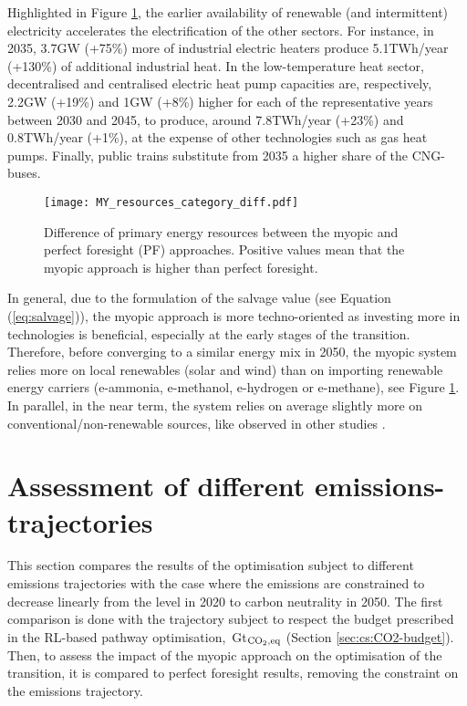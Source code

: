 Highlighted in Figure \ref{fig:my_pestd_res_cat_diff}, the earlier availability of renewable (and intermittent) electricity accelerates the electrification of the other sectors. For instance, in 2035, 3.7GW (+75\%) more of industrial electric heaters produce 5.1TWh/year (+130\%) of additional industrial heat. In the low-temperature heat sector, decentralised and centralised electric heat pump capacities are, respectively, 2.2GW (+19\%) and 1GW (+8\%) higher for each of the representative years between 2030 and 2045, to produce, around 7.8TWh/year (+23\%) and 0.8TWh/year (+1\%), at the expense of other technologies such as gas heat pumps. Finally, public trains substitute from 2035 a higher share of the CNG-buses.

 \begin{figure}[!htbp]
\centering
\texttt{[image: MY\_resources\_category\_diff.pdf]}
\caption{Difference of primary energy resources between the myopic and perfect foresight (PF) approaches. Positive values mean that the myopic approach is higher than perfect foresight.}
\label{fig:my_pestd_res_cat_diff}
\end{figure}

In general, due to the formulation of the salvage value (see Equation (\ref{eq:salvage})), the myopic approach is more techno-oriented as investing more in technologies is beneficial, especially at the early stages of the transition. Therefore, before converging to a similar energy mix in 2050, the myopic system relies more on local renewables (\eg solar and wind) than on importing renewable energy carriers (\eg e-ammonia, e-methanol, e-hydrogen or e-methane), see Figure \ref{fig:my_pestd_res_cat_diff}. In parallel, in the near term, the system relies on average slightly more on conventional/non-renewable sources, like observed in other studies \cite{keppo2010short,nyqvist2005limited,hedenus2006induced}.


\section{Assessment of different emissions-trajectories}
\label{app:CO2_trajectories}
This section compares the results of the optimisation subject to different emissions trajectories with the case where the emissions are constrained to decrease linearly from the level in 2020 to carbon neutrality in 2050. The first comparison is done with the trajectory subject to respect the  budget prescribed in the \gls{RL}-based pathway optimisation, \,Gt$_{\ce{CO2},\text{eq}}$ (Section \ref{sec:cs:CO2-budget}). Then, to assess the impact of the myopic approach on the optimisation of the transition, it is compared to perfect foresight results, removing the constraint on the emissions trajectory.


